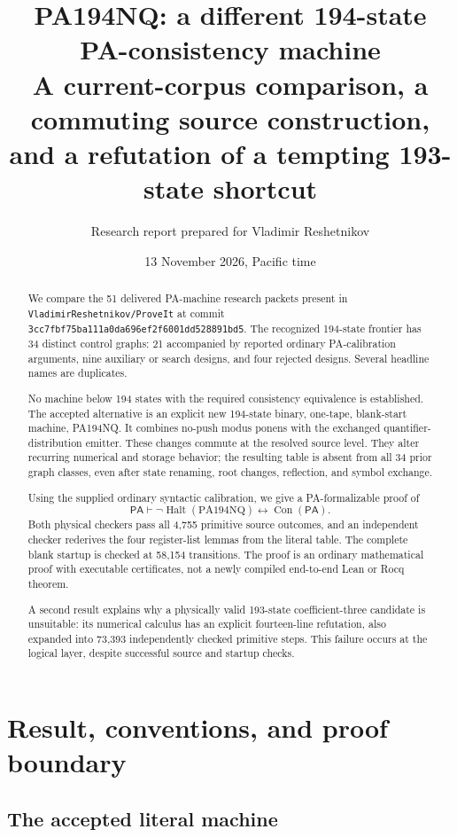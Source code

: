 \documentclass[10pt,letterpaper]{article}
\title{\textbf{PA194NQ: a different 194-state\protect\\PA-consistency machine}\\[5pt]
\large A current-corpus comparison, a commuting source construction,\protect\\
and a refutation of a tempting 193-state shortcut}
\author{Research report prepared for Vladimir Reshetnikov}
\date{13 November 2026, Pacific time}
\newcommand{\PA}{\mathsf{PA}}
\newcommand{\Con}{\operatorname{Con}}
\newcommand{\Halt}{\operatorname{Halt}}
\begin{document}
\maketitle
\begin{abstract}
We compare the 51 delivered PA-machine research packets present in
\texttt{VladimirReshetnikov/ProveIt} at commit
\texttt{3cc7fbf75ba111a0da696ef2f6001dd528891bd5}. The recognized 194-state
frontier has 34 distinct control graphs: 21 accompanied by reported ordinary
PA-calibration arguments, nine auxiliary or search designs, and four rejected
designs. Several headline names are duplicates.

No machine below 194 states with the required consistency equivalence is
established. The accepted alternative is an explicit new 194-state binary,
one-tape, blank-start machine, PA194NQ. It combines no-push modus ponens with
the exchanged quantifier-distribution emitter. These changes commute at the
resolved source level. They alter recurring numerical and storage behavior;
the resulting table is absent from all 34 prior graph classes, even after
state renaming, root changes, reflection, and symbol exchange.

Using the supplied ordinary syntactic calibration, we give a PA-formalizable
proof of
\[\PA\vdash\neg\Halt(\mathrm{PA194NQ})\leftrightarrow\Con(\PA).\]
Both physical checkers pass all 4,755 primitive source outcomes, and an
independent checker rederives the four register-list lemmas from the literal
table. The complete blank startup is checked at 58,154 transitions. The proof
is an ordinary mathematical proof with executable certificates, not a newly
compiled end-to-end Lean or Rocq theorem.

A second result explains why a physically valid 193-state coefficient-three
candidate is unsuitable: its numerical calculus has an explicit fourteen-line
refutation, also expanded into 73,393 independently checked primitive steps.
This failure occurs at the logical layer, despite successful source and
startup checks.
\end{abstract}

\newpage
\tableofcontents
\newpage

\section{Result, conventions, and proof boundary}

\subsection{The accepted literal machine}
\end{document}
